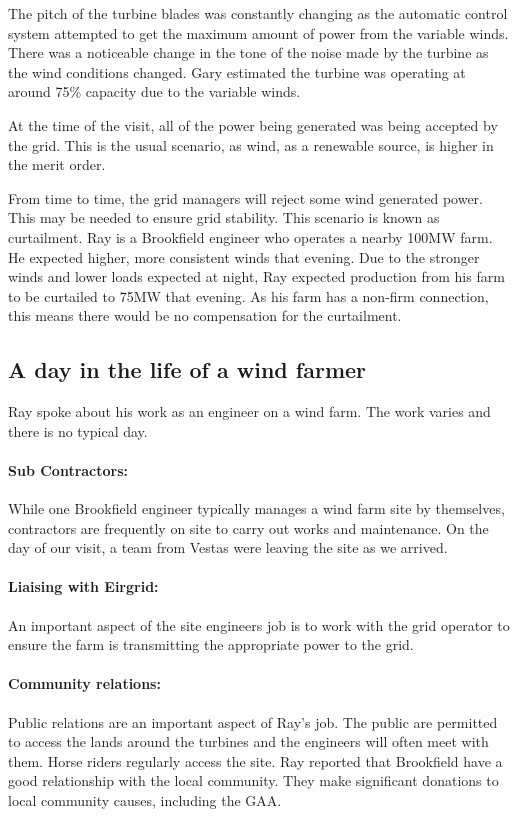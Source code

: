 \documentclass[12pt]{article} %
\begin{document}
The pitch of the turbine blades was constantly changing as the automatic control system attempted to get the maximum amount of power from the variable winds. There was a noticeable change in the tone of the noise made by the turbine as the wind conditions changed.
Gary estimated the turbine was operating at around 75\% capacity due to the variable winds.

At the time of the visit, all of the power being generated was being accepted by the grid. This is the usual scenario, as wind, as a renewable source, is higher in the merit order. %

From time to time, the grid managers will reject some wind generated power. This may be needed to ensure grid stability. This scenario is known as curtailment.
Ray is a Brookfield engineer who operates a nearby 100MW farm.
He expected higher, more consistent winds that evening. Due to the stronger winds and lower loads expected at night, Ray expected production from his farm to be curtailed to 75MW that evening. As his farm has a non-firm connection, this means there would be no compensation for the curtailment.

\subsection{A day in the life of a wind farmer}
Ray spoke about his work as an engineer on a wind farm. The work varies and there is no typical day.

\paragraph{Sub Contractors:} While one Brookfield engineer typically manages a wind farm site by themselves, contractors are frequently on site to carry out works and maintenance. On the day of our visit, a team from Vestas were leaving the site as we arrived. 

\paragraph{Liaising with Eirgrid:} An important aspect of the site engineers job is to work with the grid operator to ensure the farm is transmitting the appropriate power to the grid.

\paragraph{Community relations:} Public relations are an important aspect of Ray's job. The public are permitted to access the lands around the turbines and the engineers will often meet with them. Horse riders regularly access the site.
Ray reported that Brookfield have a good relationship with the local community. They make significant donations to local community causes, including the GAA.
\end{document}
